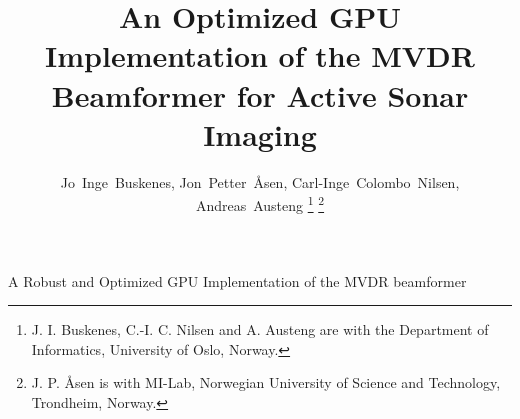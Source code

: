 \documentclass[12pt,journal,draftclsnofoot,onecolumn]{IEEEtran}
\newcommand\1{\vec 1}
\begin{document}
\title{An Optimized GPU Implementation of the MVDR Beamformer for Active Sonar Imaging}

\author{Jo~Inge~Buskenes, %
        Jon~Petter~\AA{}sen, %
        Carl-Inge~Colombo~Nilsen, %
        Andreas~Austeng%
\thanks{J. I. Buskenes, C.-I. C. Nilsen and A. Austeng are with the Department of Informatics, University of Oslo, Norway.}%
\thanks{J. P. \AA{}sen is with MI-Lab, Norwegian University of Science and Technology, Trondheim, Norway.}%
}

%
{A Robust and Optimized GPU Implementation of the MVDR beamformer}


\end{document}
